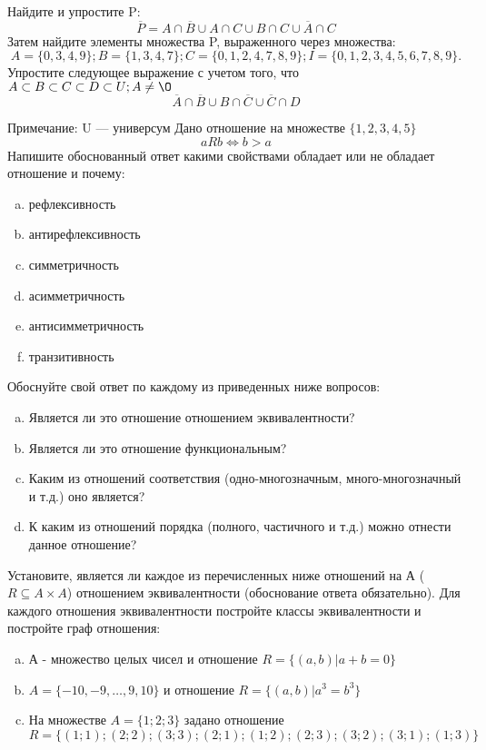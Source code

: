 \documentclass[10pt]{exam}
\begin{document}
\begin{questions}
\question
Найдите и упростите P:
\begin{equation*}
\overline{P} = A \cap \overline{B} \cup A \cap C \cup B \cap C \cup \overline{A} \cap C
\end{equation*}
Затем найдите элементы множества P, выраженного через множества:
\begin{equation*}
A = \{0, 3, 4, 9\}; 
B = \{1, 3, 4, 7\};
C = \{0, 1, 2, 4, 7, 8, 9\};
I = \{0, 1, 2, 3, 4, 5, 6, 7, 8, 9\}.
\end{equation*}\question
Упростите следующее выражение с учетом того, что $A\subset B \subset C \subset D \subset U; A \neq \O$
\begin{equation*}
\overline{A} \cap \overline{B} \cup B \cap \overline{C} \cup \overline{C} \cap D
\end{equation*}

Примечание: U — универсум\question
Дано отношение на множестве $\{1, 2, 3, 4, 5\}$ 
\begin{equation*}
aRb \iff b > a
\end{equation*}
Напишите обоснованный ответ какими свойствами обладает или не обладает отношение и почему:   
\begin{enumerate} [a)]\setcounter{enumi}{0}
\item рефлексивность
\item антирефлексивность
\item симметричность
\item асимметричность
\item антисимметричность
\item транзитивность
\end{enumerate}

Обоснуйте свой ответ по каждому из приведенных ниже вопросов:
\begin{enumerate} [a)]\setcounter{enumi}{0}
    \item Является ли это отношение отношением эквивалентности?
    \item Является ли это отношение функциональным?
    \item Каким из отношений соответствия (одно-многозначным, много-многозначный и т.д.) оно является?
    \item К каким из отношений порядка (полного, частичного и т.д.) можно отнести данное отношение?
\end{enumerate}

\question
Установите, является ли каждое из перечисленных ниже отношений на А ($R \subseteq A \times A$) отношением эквивалентности (обоснование ответа обязательно). Для каждого отношения эквивалентности 
постройте классы эквивалентности и постройте граф отношения:
\begin{enumerate}[a)]\setcounter{enumi}{0}
\item А - множество целых чисел и отношение $R = \{(a,b)|a + b = 0\}$
\item $A = \{-10, -9, …, 9, 10\}$ и отношение $R = \{(a,b)|a^{3} = b^{3}\}$
\item На множестве $A = \{1; 2; 3\}$ задано отношение $R = \{(1; 1); (2; 2); (3; 3); (2; 1); (1; 2); (2; 3); (3; 2); (3; 1); (1; 3)\}$


\end{enumerate}
\end{questions}
\end{document}
